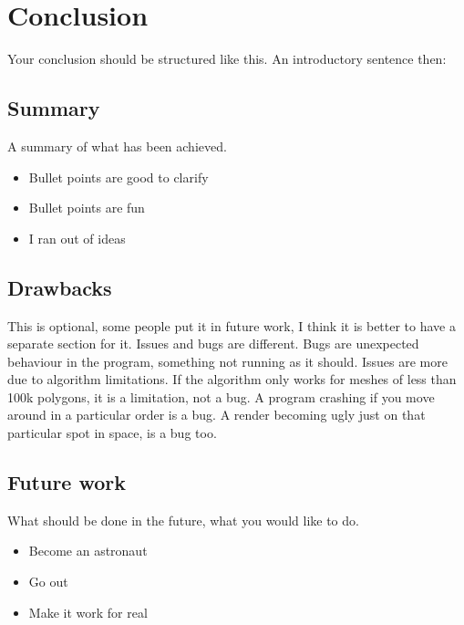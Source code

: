 
\ifx\isEmbedded\undefined

\graphicspath{{../img/}}

\fi

\chapter{Conclusion}
\label{chap:conclusion}

Your conclusion should be structured like this. An introductory sentence then:

\section{Summary}

A summary of what has been achieved.

\begin{itemize}
\item Bullet points are good to clarify
\item Bullet points are fun
\item I ran out of ideas
\end{itemize}

\section{Drawbacks}

This is optional, some people put it in future work, I think it is better to have a separate section for it. Issues and bugs are different. Bugs are unexpected behaviour in the program, something not running as it should. Issues are more due to algorithm limitations. If the algorithm only works for meshes of less than 100k polygons, it is a limitation, not a bug. A program crashing if you move around in a particular order is a bug. A render becoming ugly just on that particular spot in space, is a bug too.

\section{Future work}

What should be done in the future, what you would like to do.

\begin{itemize}
\item Become an astronaut
\item Go out
\item Make it work for real
\end{itemize}


\ifx\isEmbedded\undefined


\pagebreak

\fi